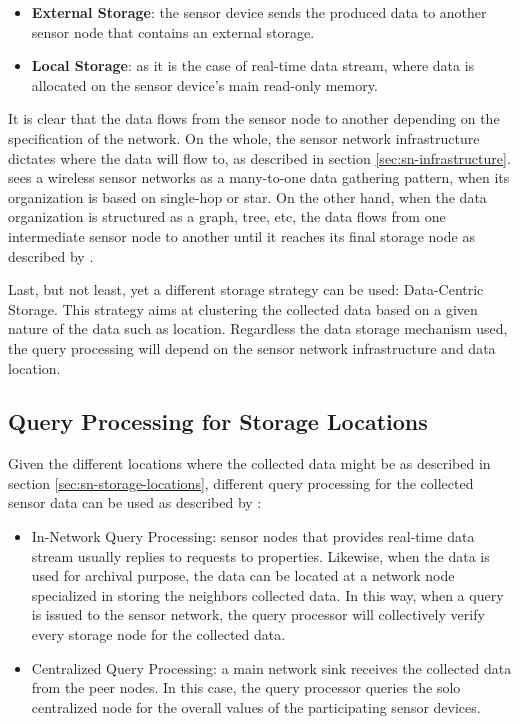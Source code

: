 \begin{itemize}
  \item \textbf{External Storage}: the sensor device sends the produced data to
  another sensor node that contains an external storage. 
  \item \textbf{Local Storage}: as it is the case of real-time data stream, where data
  is allocated on the sensor device's main read-only memory.
\end{itemize}

It is clear that the data flows from the sensor node to another depending on
the specification of the network. On the whole, the sensor network
infrastructure dictates where the data will flow to, as described in section
\ref{sec:sn-infrastructure}. \cite{sn-storage02} sees a wireless sensor
networks as a many-to-one data gathering pattern, when its organization is
based on single-hop or star. On the other hand, when the data organization is
structured as a graph, tree, etc, the data flows from one intermediate sensor
node to another until it reaches its final storage node as described by
\cite{sn-storage01} \cite{sn-storage03}. 

Last, but not least, yet a different storage strategy can be used: Data-Centric
Storage. This strategy aims at clustering the collected data based on a given nature of the
data such as location. Regardless the data storage mechanism used, the query
processing will depend on the sensor network infrastructure and data location.

\subsection{Query Processing for Storage Locations}

Given the different locations where the collected data might be as described in
section \ref{sec:sn-storage-locations}, different query processing for the
collected sensor data can be used as described by \cite{sn-storage03}:

\begin{itemize}
  \item {In-Network Query Processing}: sensor nodes that provides real-time
  data stream usually replies to requests to properties. Likewise, when the
  data is used for archival purpose, the data can be located at a network node
  specialized in storing the neighbors collected data. In this way, when a
  query is issued to the sensor network, the query processor will
  collectively verify every storage node for the collected data.
  \item {Centralized Query Processing}: a main network sink receives the
  collected data from the peer nodes. In this case, the query processor queries
  the solo centralized node for the overall values of the participating sensor
  devices.
\end{itemize}

